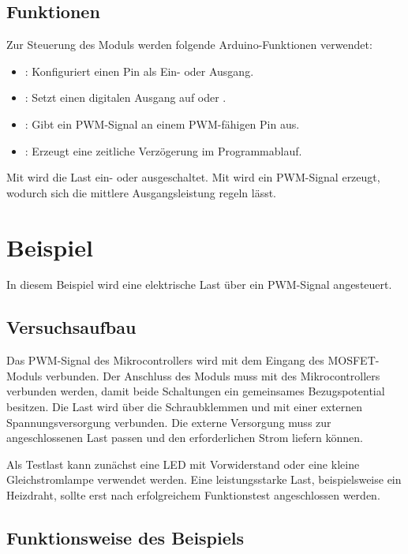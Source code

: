 \subsection{Funktionen}

Zur Steuerung des Moduls werden folgende Arduino-Funktionen verwendet:

\begin{itemize}
	\item {}: Konfiguriert einen Pin als Ein- oder Ausgang.
	\item {}: Setzt einen digitalen Ausgang auf  oder .
	\item {}: Gibt ein PWM-Signal an einem PWM-fähigen Pin aus.
	\item {}: Erzeugt eine zeitliche Verzögerung im Programmablauf.
\end{itemize}

Mit  wird die Last ein- oder ausgeschaltet. 
Mit  wird ein PWM-Signal erzeugt, wodurch sich die mittlere Ausgangsleistung regeln lässt.

\section{Beispiel}

In diesem Beispiel wird eine elektrische Last über ein PWM-Signal angesteuert.

\subsection{Versuchsaufbau}

Das PWM-Signal des Mikrocontrollers wird mit dem Eingang  des MOSFET-Moduls verbunden. 
Der Anschluss  des Moduls muss mit  des Mikrocontrollers verbunden werden, damit beide Schaltungen ein gemeinsames Bezugspotential besitzen. 
Die Last wird über die Schraubklemmen  und  mit einer externen Spannungsversorgung verbunden. 
Die externe Versorgung muss zur angeschlossenen Last passen und den erforderlichen Strom liefern können.

Als Testlast kann zunächst eine LED mit Vorwiderstand oder eine kleine Gleichstromlampe verwendet werden. 
Eine leistungsstarke Last, beispielsweise ein Heizdraht, sollte erst nach erfolgreichem Funktionstest angeschlossen werden.

\subsection{Funktionsweise des Beispiels}

